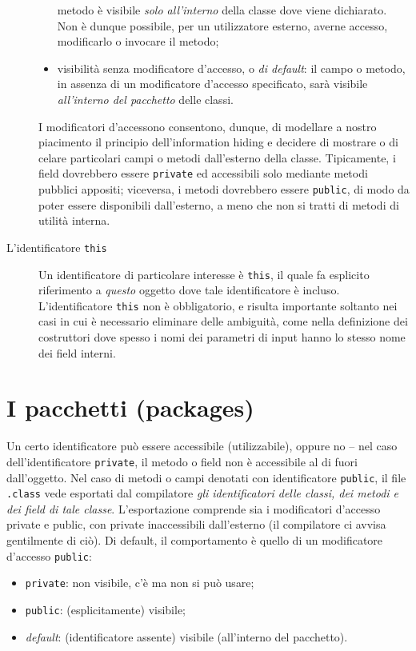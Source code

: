 \documentclass[\fontsizeclass,twocolumn]{\classname}
\theoremstyle{definition}
\theoremstyle{definition}
\begin{document}
\begin{description}
\begin{itemize}
        metodo è visibile \emph{solo all'interno} della classe dove viene
        dichiarato. Non è dunque possibile, per un utilizzatore esterno, averne
        accesso, modificarlo o invocare il metodo;
    \item visibilità senza modificatore d'accesso, o \emph{di default}: il
        campo o metodo, in assenza di un modificatore d'accesso specificato,
        sarà visibile \emph{all'interno del pacchetto} delle classi.
\end{itemize}
    I modificatori d'accessono consentono, dunque, di modellare a nostro
    piacimento il principio dell'information hiding e decidere di mostrare o di
    celare particolari campi o metodi dall'esterno della classe. Tipicamente, i
    field dovrebbero essere \texttt{private} ed accessibili solo mediante
    metodi pubblici appositi; viceversa, i metodi dovrebbero essere
    \texttt{public}, di modo da poter essere disponibili dall'esterno, a meno che
    non si tratti di metodi di utilità interna.
    \item[L'identificatore \texttt{this}] Un identificatore di particolare
        interesse è \texttt{this}, il quale fa esplicito riferimento a
        \emph{questo} oggetto dove tale identificatore è incluso.
        L'identificatore \texttt{this} non è obbligatorio, e risulta importante
        soltanto nei casi in cui è necessario eliminare delle ambiguità, come
        nella definizione dei costruttori dove spesso i nomi dei parametri di
        input hanno lo stesso nome dei field interni.
\end{description}


\chapter{I pacchetti (packages)} 

Un certo identificatore può essere accessibile (utilizzabile), oppure
no \--- nel caso dell'identificatore \texttt{private}, il metodo o field non è
accessibile al di fuori dall'oggetto. Nel caso di metodi o campi denotati con
identificatore \texttt{public}, il file \texttt{.class} vede esportati dal
compilatore \emph{gli identificatori delle classi, dei metodi e dei field di
tale classe}. L'esportazione comprende sia i modificatori d'accesso private e
public, con private inaccessibili dall'esterno (il compilatore ci avvisa
gentilmente di ciò). Di default, il comportamento è quello di un modificatore
d'accesso \texttt{public}:

\begin{itemize}
    \item \texttt{private}: non visibile, c'è ma non si può usare;
    \item \texttt{public}: (esplicitamente) visibile;
    \item \emph{default}: (identificatore assente) visibile (all'interno del
        pacchetto).
\end{itemize}
\end{document}

